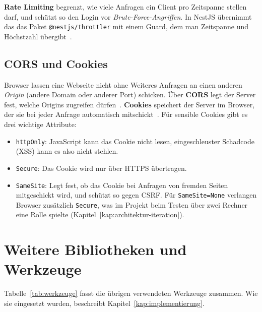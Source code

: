 \textbf{Rate Limiting} begrenzt, wie viele Anfragen ein Client pro Zeitspanne stellen darf, und schützt so den Login vor \emph{Brute-Force-Angriffen}. In NestJS übernimmt das das Paket \texttt{@nestjs/throttler} mit einem Guard, dem man Zeitspanne und Höchstzahl übergibt~\cite{nestjs-throttler}.

\subsection{CORS und Cookies}
\label{sec:cors-cookies}

Browser lassen eine Webseite nicht ohne Weiteres Anfragen an einen anderen \emph{Origin} (andere Domain oder anderer Port) schicken. Über \textbf{CORS} legt der Server fest, welche Origins zugreifen dürfen~\cite{mdn-cors}. \textbf{Cookies} speichert der Server im Browser, der sie bei jeder Anfrage automatisch mitschickt~\cite{mdn-cookies}. Für sensible Cookies gibt es drei wichtige Attribute:
\begin{itemize}
  \item \texttt{httpOnly}: JavaScript kann das Cookie nicht lesen, eingeschleuster Schadcode (XSS) kann es also nicht stehlen.
  \item \texttt{Secure}: Das Cookie wird nur über HTTPS übertragen.
  \item \texttt{SameSite}: Legt fest, ob das Cookie bei Anfragen von fremden Seiten mitgeschickt wird, und schützt so gegen CSRF. Für \texttt{SameSite=None} verlangen Browser zusätzlich \texttt{Secure}, was im Projekt beim Testen über zwei Rechner eine Rolle spielte (Kapitel~\ref{kap:architektur-iteration}).
\end{itemize}

\section{Weitere Bibliotheken und Werkzeuge}
\label{sec:weitere}
\label{sec:jest}
\label{sec:zod}
\label{sec:axios}
\label{sec:pm2}
\label{sec:figma}

Tabelle~\ref{tab:werkzeuge} fasst die übrigen verwendeten Werkzeuge zusammen. Wie sie eingesetzt wurden, beschreibt Kapitel~\ref{kap:implementierung}.

